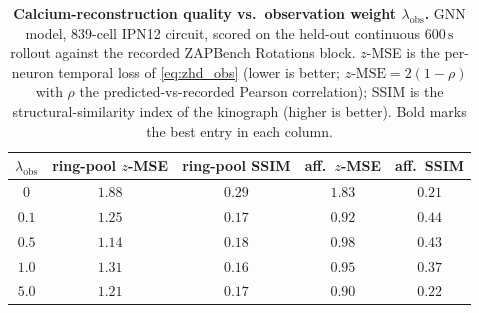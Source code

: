 \documentclass[11pt]{article}
\begin{document}
\begin{table}[H]
\centering
\small
\begin{tabular}{c c c c c}
\toprule
$\lambda_{\mathrm{obs}}$ & ring-pool $z$-MSE & ring-pool SSIM
       & aff.\ $z$-MSE & aff.\ SSIM \\
\midrule
$0$   & $1.88$ & $\mathbf{0.29}$ & $1.83$ & $0.21$ \\
$0.1$ & $1.25$ & $0.17$ & $0.92$ & $\mathbf{0.44}$ \\
$0.5$ & $\mathbf{1.14}$ & $0.18$ & $0.98$ & $0.43$ \\
$1.0$ & $1.31$ & $0.16$ & $0.95$ & $0.37$ \\
$5.0$ & $1.21$ & $0.17$ & $\mathbf{0.90}$ & $0.22$ \\
\bottomrule
\end{tabular}
\caption{\textbf{Calcium-reconstruction quality vs.\ observation weight
$\lambda_{\mathrm{obs}}$.} GNN model, $839$-cell IPN12 circuit, scored on
the held-out continuous $600\,\mathrm{s}$ rollout against the recorded
ZAPBench Rotations block. $z$-MSE is the per-neuron temporal loss of
\cref{eq:zhd_obs} (lower is better; $z\text{-MSE} = 2(1-\rho)$ with $\rho$
the predicted-vs-recorded Pearson correlation);
SSIM is the structural-similarity index of the kinograph (higher is
better). Bold marks the best entry in each column.}
\label{tab:zhd_obs_sweep}
\end{table}
\end{document}
